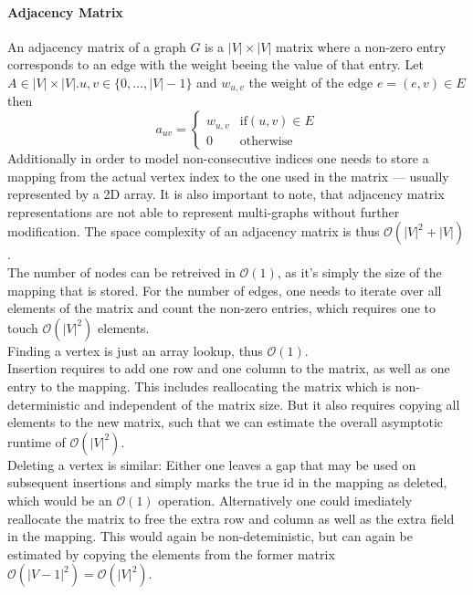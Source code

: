         \paragraph{Adjacency Matrix}
        An adjacency matrix of a graph $G$ is a $|V|\times|V|$ matrix where a non-zero entry corresponds to an edge with the weight beeing the value of that entry. 
        Let $A \in |V|\times|V|. u, v \in \{0, \dots, |V| - 1\}$ and $w_{u,v}$ the weight of the edge $e = (e,v) \in E$ then
        \[ a_{uv} = \begin{cases}
                     w_{u,v} & \text{if} (u,v) \in E \\
                     0 & \text{otherwise}
                    \end{cases}
        \]
        Additionally in order to model non-consecutive indices one needs to store a mapping from the actual vertex index to the one used in the matrix --- usually represented by a 2D array. 
        It is also important to note, that adjacency matrix representations are not able to represent multi-graphs without further modification.
        The space complexity of an adjacency matrix is thus $\mathcal{O}(|V|^2 + |V|)$. \\
                
        The number of nodes can be retreived in $\mathcal{O}(1)$, as it's simply the size of the mapping that is stored.
        For the number of edges, one needs to iterate over all elements of the matrix and count the non-zero entries, which requires one to touch $\mathcal{O}(|V|^2)$ elements.\\

        Finding a vertex is just an array lookup, thus $\mathcal{O}(1)$. \\

        Insertion requires to add one row and one column to the matrix, as well as one entry to the mapping. 
        This includes reallocating the matrix which is non-deterministic and independent of the matrix size. But it also requires copying all elements to the new matrix, such that we can estimate the overall asymptotic runtime of $\mathcal{O}(|V|^2)$. \\
        
        Deleting a vertex is similar: Either one leaves a gap that may be used on subsequent insertions and simply marks the true id in the mapping as deleted, which would be an $\mathcal{O}(1)$ operation. 
        Alternatively one could imediately reallocate the matrix to free the extra row and column as well as the extra field in the mapping. 
        This would again be non-deteministic, but can again be estimated by copying the elements from the former matrix $\mathcal{O}(|V-1|^2) = \mathcal{O}(|V|^2)$. \\
        
